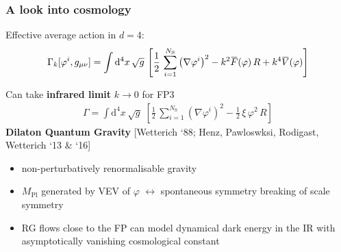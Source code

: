 \documentclass[]{beamer}  %
\newcommand\NS{ N_{\scriptscriptstyle{\mathrm{S}}} }
\newcommand\MPl{ M_{\scriptscriptstyle{\mathrm{Pl}}}{} }
\newcommand{\overbar}[1]{\mkern 1.5mu\overline{\mkern-1.5mu#1\mkern-1.5mu}\mkern 1.5mu}
\begin{document}
\begin{frame}
  \frametitle{A look into cosmology}

  Effective average action in $d=4$:
  \begin{align*}
      \Gamma_k [\varphi^i, g_{\mu\nu}] =
      \int \mathrm d^4x \, \sqrt{g} \,
      \left[
          \frac{1}{2} \, \sum_{i=1}^{\NS} \left( \nabla\varphi^i \right)^2
        - k^2 \overbar F(\varphi) \, R
        + k^4 \overbar V(\varphi)
      \right]
  \end{align*}

  Can take \textbf{infrared limit} $k \rightarrow 0$ for FP3
  \begin{align*}
    \boxed{
      \Gamma = \int \mathrm{d}^4x \, \sqrt{g} \;
      \left[
        \frac{1}{2} \, \sum_{i=1}^{\NS} \left( \nabla\varphi^i \right)^2
        - \frac12 \, \xi \, \varphi^2 \, R
      \right]
    }
  \end{align*}
  \hfill \textbf{Dilaton Quantum Gravity} [Wetterich `88; Henz, Pawloswksi, Rodigast, Wetterich `13 \& `16]

  \vspace{10pt}
  \begin{itemize}
    \item non-perturbatively renormalisable gravity\\[5pt]
    \item $\MPl$ generated by VEV of $\varphi$ $\leftrightarrow$ spontaneous symmetry breaking of scale symmetry\\[5pt]
    \item RG flows close to the FP can model dynamical dark energy in the IR
      with asymptotically vanishing cosmological constant %
  \end{itemize}

\end{frame}


\end{document}
